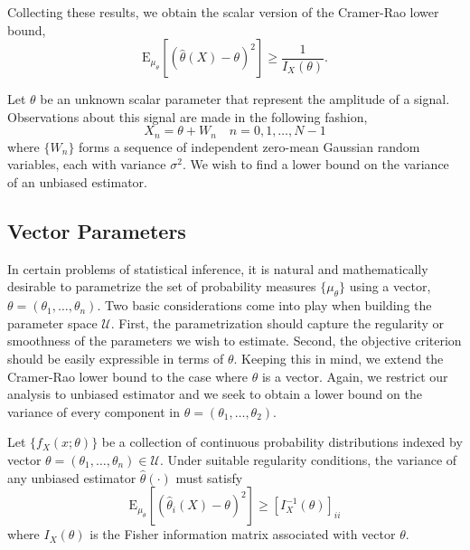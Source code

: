 Collecting these results, we obtain the scalar version of the Cramer-Rao lower bound,
\begin{equation*}
\mathrm{E}_{\mu_{\theta}} \left[ \left( \hat{\theta} (X) - \theta \right)^2 \right]
\geq \frac{1}{I_X (\theta)} .
\end{equation*}


\begin{example}
Let $\theta$ be an unknown scalar parameter that represent the amplitude of a signal.
Observations about this signal are made in the following fashion,
\begin{equation*}
X_n = \theta + W_n \quad n = 0, 1, \ldots, N-1
\end{equation*}
where $\{ W_n \}$ forms a sequence of independent zero-mean Gaussian random variables, each with variance $\sigma^2$.
We wish to find a lower bound on the variance of an unbiased estimator.
\end{example}


\subsection{Vector Parameters}

In certain problems of statistical inference, it is natural and mathematically desirable to parametrize the set of probability measures $\{ \mu_{\theta} \}$ using a vector, $\theta = (\theta_1, \ldots, \theta_n)$.
Two basic considerations come into play when building the parameter space $\mathcal{U}$.
First, the parametrization should capture the regularity or smoothness of the parameters we wish to estimate.
Second, the objective criterion should be easily expressible in terms of $\theta$.
Keeping this in mind, we extend the Cramer-Rao lower bound to the case where $\theta$ is a vector.
Again, we restrict our analysis to unbiased estimator and we seek to obtain a lower bound on the variance of every component in $\theta = (\theta_1, \ldots, \theta_2)$.

\begin{theorem}
Let $\{ f_X (x; \theta) \}$ be a collection of continuous probability distributions indexed by vector $\theta = (\theta_1, \ldots, \theta_n) \in \mathcal{U}$.
Under suitable regularity conditions, the variance of any unbiased estimator $\hat{\theta} (\cdot)$ must satisfy
\begin{equation*}
\mathrm{E}_{\mu_{\theta}} \left[ \left( \hat{\theta}_i (X) - \theta \right)^2 \right]
\geq \left[ I_X^{-1} (\theta) \right]_{ii}
\end{equation*}
where $I_X(\theta)$ is the Fisher information matrix associated with vector $\theta$.
\end{theorem}


